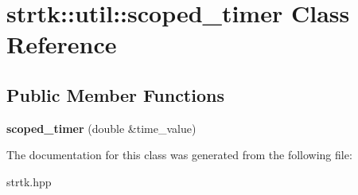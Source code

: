 \hypertarget{classstrtk_1_1util_1_1scoped__timer}{\section{strtk\-:\-:util\-:\-:scoped\-\_\-timer Class Reference}
\label{classstrtk_1_1util_1_1scoped__timer}
}
\subsection*{Public Member Functions}
\begin{DoxyCompactItemize}
\item 
\hypertarget{classstrtk_1_1util_1_1scoped__timer_aeed378ea2b596849dd61cd703bc0f595}{{\bfseries scoped\-\_\-timer} (double \&time\-\_\-value)}\label{classstrtk_1_1util_1_1scoped__timer_aeed378ea2b596849dd61cd703bc0f595}

\end{DoxyCompactItemize}


The documentation for this class was generated from the following file\-:\begin{DoxyCompactItemize}
\item 
strtk.\-hpp\end{DoxyCompactItemize}
